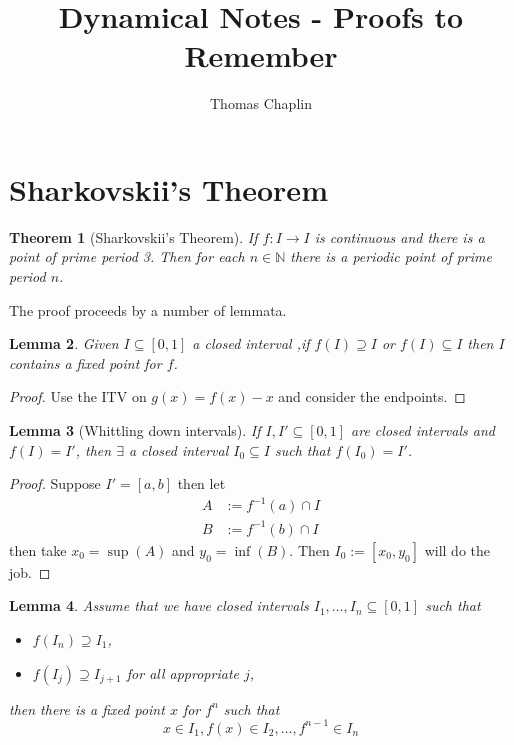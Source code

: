 \documentclass[11pt]{article}
\title{Dynamical Notes - Proofs to Remember}
\author{Thomas Chaplin}
\date{}
\newcommand{\defeq}{:=}
\newcommand{\N}{\mathbb{N}}
\newtheorem{theorem}{Theorem}[section]
\newtheorem{lemma}[theorem]{Lemma}
\begin{document}
\maketitle

\section{Sharkovskii's Theorem}
\begin{theorem}[Sharkovskii's Theorem]
\label{thrm:shark}
If $f:I \to I $ is continuous and there is a point of prime period 3.
Then for each $n\in \N$ there is a periodic point of prime period $n$.
\end{theorem}

The proof proceeds by a number of lemmata.

\begin{lemma}
Given $I\subseteq[0 ,1 ]$ a closed interval ,if $f(I) \supseteq I$ or $f(I) \subseteq I$ then $I$ contains a fixed point for $f$.
\end{lemma}

\begin{proof}
Use the ITV on $g(x)=f(x)-x$ and consider the endpoints.
\end{proof}

\begin{lemma}[Whittling down intervals]
If $I, I' \subseteq [0,1]$ are closed intervals and $f(I)=I'$, then $\exists$ a closed interval $I_0\subseteq I$ such that $f(I_0)=I'$.
\end{lemma}
\begin{proof}
Suppose $I'=[a, b]$ then let
\begin{align*}
	A & \defeq f^{-1}(a)\cap I \\
	B & \defeq f^{-1}(b)\cap I
\end{align*}
then take $x_0=\sup(A)$ and $y_0=\inf(B)$.
Then $I_0\defeq [x_0, y_0]$ will do the job.
\end{proof}

\begin{lemma}
Assume that we have closed intervals $I_1, \dots, I_n \subseteq [0, 1]$ such that
\begin{itemize}
	\item $f(I_n)\supseteq I_1$,
	\item $f(I_j)\supseteq I_{j+1}$ for all appropriate $j$,
\end{itemize}
then there is a fixed point $x$ for $f^n$ such that
\[
	x\in I_1, f(x) \in I_2, \dots , f^{n-1}\in I_n
\]
\end{lemma}
\end{document}
